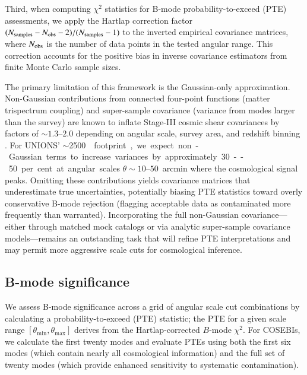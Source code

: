 \documentclass{aa}
\begin{document}
Third, when computing $\chi^2$ statistics for B-mode probability-to-exceed (PTE) assessments, we apply the Hartlap correction factor $(N_{\rm samples} - N_{\rm obs} - 2)/(N_{\rm samples} - 1)$ \citep{hartlap07} to the inverted empirical covariance matrices, where $N_{\rm obs}$ is the number of data points in the tested angular range. This correction accounts for the positive bias in inverse covariance estimators from finite Monte Carlo sample sizes.

The primary limitation of this framework is the Gaussian-only approximation. Non-Gaussian contributions from connected four-point functions (matter trispectrum coupling) and super-sample covariance (variance from modes larger than the survey) are known to inflate Stage-III cosmic shear covariances by factors of $\sim 1.3$--$2.0$ depending on angular scale, survey area, and redshift binning \citep{joachimi.etal08, krause.eifler17}. For UNIONS' $\sim$\SI{2500}{\square\deg} footprint, we expect non-Gaussian terms to increase variances by approximately \num{30}--\num{50}~per~cent at angular scales $\theta \sim 10$--$50$~arcmin where the cosmological signal peaks. Omitting these contributions yields covariance matrices that underestimate true uncertainties, potentially biasing PTE statistics toward overly conservative B-mode rejection (flagging acceptable data as contaminated more frequently than warranted). Incorporating the full non-Gaussian covariance—either through matched mock catalogs or via analytic super-sample covariance models—remains an outstanding task that will refine PTE interpretations and may permit more aggressive scale cuts for cosmological inference.

\subsection{B-mode significance}
\label{sec:scale_cuts}

We assess B-mode significance across a grid of angular scale cut combinations by calculating a probability-to-exceed (PTE) statistic; the PTE for a given scale range $[\theta_{\mathrm{min}}, \theta_{\mathrm{max}}]$ derives from the Hartlap-corrected $B$-mode $\chi^2$.
For COSEBIs, we calculate the first twenty modes and evaluate PTEs using both the first six modes (which contain nearly all cosmological information) and the full set of twenty modes (which provide enhanced sensitivity to systematic contamination).
\end{document}
